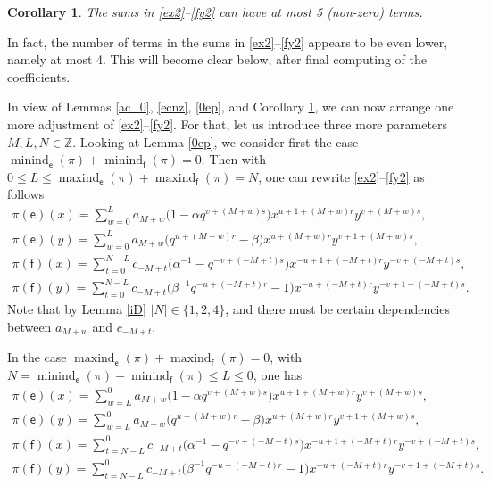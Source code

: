 \documentclass[10pt,a4paper]{amsart}
\numberwithin{equation}{section}
\newtheorem{Corollary}[Theorem]{Corollary}
\begin{document}
\begin{Corollary}\label{5terms}The sums in \eqref{ex2}--\eqref{fy2} can have at most 5 (non-zero) terms.
\end{Corollary}

\begin{Remark}In fact, the number of terms in the sums in \eqref{ex2}--\eqref{fy2} appears to be even lower, namely at most 4. This will become clear below, after final computing of the coefficients.
\end{Remark}

In view of Lemmas \ref{ac_0}, \ref{ecnz}, \ref{0ep}, and Corollary \ref{5terms}, we can now arrange one more adjustment of \eqref{ex2}--\eqref{fy2}. For that, let us introduce three more parameters $M,L,N\in\mathbb{Z}$. Looking at Lemma \ref{0ep}, we consider first the case $\operatorname{minind}_\mathsf{e}(\pi)+\operatorname{minind}_\mathsf{f}(\pi)=0$. Then with $0\le L\le\operatorname{maxind}_\mathsf{e}(\pi)+
\operatorname{maxind}_\mathsf{f}(\pi)=N$, one can rewrite \eqref{ex2}--\eqref{fy2} as follows
\begin{gather}
\pi(\mathsf{e})(x) =\sum_{w=0}^La_{M+w}\big(1-\alpha q^{v+(M+w)s}\big)x^{u+1+(M+w)r}y^{v+(M+w)s}, \label{ex3}\\
\pi(\mathsf{e})(y) =\sum_{w=0}^La_{M+w}\big(q^{u+(M+w)r}-\beta\big)x^{u+(M+w)r}y^{v+1+(M+w)s},\label{ey3}\\
\pi(\mathsf{f})(x) =\sum_{t=0}^{N-L}c_{-M+t}\big(\alpha^{-1}-q^{-v+(-M+t)s}\big)x^{-u+1+(-M+t)r}y^{-v+(-M+t)s}, \label{fx3}\\
\pi(\mathsf{f})(y)=\sum_{t=0}^{N-L}c_{-M+t}\big(\beta^{-1}q^{-u+(-M+t)r}-1\big)x^{-u+(-M+t)r}y^{-v+1+(-M+t)s}. \label{fy3}
\end{gather}
Note that by Lemma \ref{iD} $|N|\in\{1,2,4\}$, and there must be certain dependencies between $a_{M+w}$ and $c_{-M+t}$.

In the case $\operatorname{maxind}_\mathsf{e}(\pi)+\operatorname{maxind}_\mathsf{f}(\pi)=0$, with $N=\operatorname{minind}_\mathsf{e}(\pi)+\operatorname{minind}_\mathsf{f}(\pi)\le L\le 0$, one has
\begin{gather}
\pi(\mathsf{e})(x) =\sum_{w=L}^0a_{M+w}\big(1-\alpha q^{v+(M+w)s}\big)x^{u+1+(M+w)r}y^{v+(M+w)s},\label{ex4}\\
\pi(\mathsf{e})(y) =\sum_{w=L}^0a_{M+w}\big(q^{u+(M+w)r}-\beta\big)x^{u+(M+w)r}y^{v+1+(M+w)s}, \label{ey4}\\
\pi(\mathsf{f})(x) =\sum_{t=N-L}^0c_{-M+t}\big(\alpha^{-1}-q^{-v+(-M+t)s}\big)x^{-u+1+(-M+t)r}y^{-v+(-M+t)s}, \label{fx4}\\
\pi(\mathsf{f})(y) =\sum_{t=N-L}^0c_{-M+t}\big(\beta^{-1}q^{-u+(-M+t)r}-1\big)x^{-u+(-M+t)r}y^{-v+1+(-M+t)s}. \label{fy4}
\end{gather}
\end{document}
